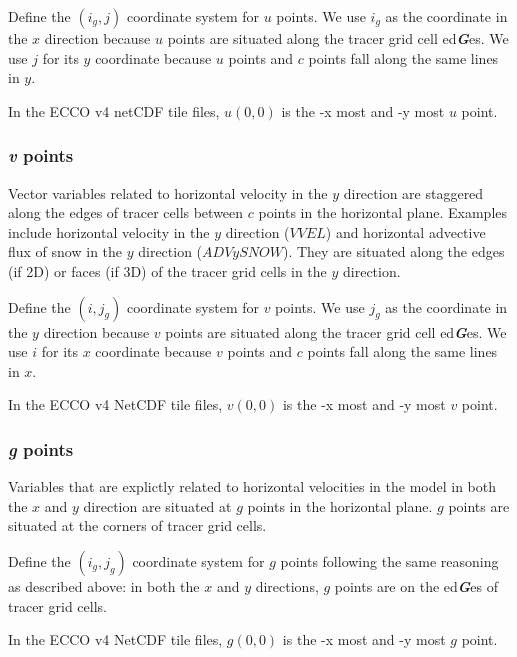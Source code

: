 \documentclass[11pt]{article}
\begin{document}
Define the \((i_g, j)\) coordinate system for \(u\) points. We use
\(i_g\) as the coordinate in the \(x\) direction because \(u\) points
are situated along the tracer grid cell ed\textbf{\emph{G}}es. We use
\(j\) for its \(y\) coordinate because \(u\) points and \(c\) points
fall along the same lines in \(y\).

In the ECCO v4 netCDF tile files, \(u(0,0)\) is the -x most and -y most
\(u\) point.

\subsubsection{\texorpdfstring{\emph{v}
points}{v points}}\label{v-points}

Vector variables related to horizontal velocity in the \(y\) direction
are staggered along the edges of tracer cells between \(c\) points in
the horizontal plane. Examples include horizontal velocity in the \(y\)
direction (\(VVEL\)) and horizontal advective flux of snow in the \(y\)
direction (\(ADVySNOW\)). They are situated along the edges (if 2D) or
faces (if 3D) of the tracer grid cells in the \(y\) direction.

Define the \((i, j_g)\) coordinate system for \(v\) points. We use
\(j_g\) as the coordinate in the \(y\) direction because \(v\) points
are situated along the tracer grid cell ed\textbf{\emph{G}}es. We use
\(i\) for its \(x\) coordinate because \(v\) points and \(c\) points
fall along the same lines in \(x\).

In the ECCO v4 NetCDF tile files, \(v(0,0)\) is the -x most and -y most
\(v\) point.

\subsubsection{\texorpdfstring{\emph{g}
points}{g points}}\label{g-points}

Variables that are explictly related to horizontal velocities in the
model in both the \(x\) and \(y\) direction are situated at \(g\) points
in the horizontal plane. \(g\) points are situated at the corners of
tracer grid cells.

Define the \((i_g, j_g)\) coordinate system for \(g\) points following
the same reasoning as described above: in both the \(x\) and \(y\)
directions, \(g\) points are on the ed\textbf{\emph{G}}es of tracer grid
cells.

In the ECCO v4 NetCDF tile files, \(g(0,0)\) is the -x most and -y most
\(g\) point.
\end{document}

